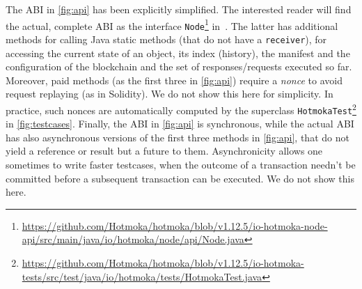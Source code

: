 The ABI in \cref{fig:api} has been explicitly simplified. The interested reader will find
the actual, complete ABI as the interface \texttt{Node}\footnote{\url{https://github.com/Hotmoka/hotmoka/blob/v1.12.5/io-hotmoka-node-api/src/main/java/io/hotmoka/node/api/Node.java}} in~\cite{hotmokacode}.
The latter has additional methods for calling Java static methods (that do not have a \texttt{receiver}),
for accessing the current state of an object, its index (history),
the manifest and the configuration of the blockchain and the set of responses/requests executed so far.
Moreover, paid methods (as the first three in \cref{fig:api}) require a \emph{nonce} to avoid
request replaying (as in Solidity). We do not show this here for simplicity. In practice, such nonces are automatically
computed by the superclass \texttt{HotmokaTest}\footnote{\url{https://github.com/Hotmoka/hotmoka/blob/v1.12.5/io-hotmoka-tests/src/test/java/io/hotmoka/tests/HotmokaTest.java}} in \cref{fig:testcases}. Finally, the ABI in
\cref{fig:api} is synchronous, while the actual ABI has also asynchronous versions of the first three
methods in \cref{fig:api}, that do not yield a reference or result but a future to them. Asynchronicity
allows one sometimes to write faster testcases, when the outcome of a transaction needn't be committed before
a subsequent transaction can be executed. We do not show this here.
